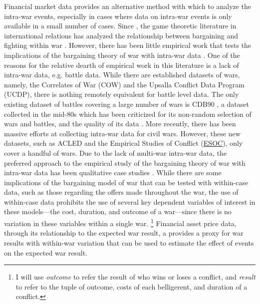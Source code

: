 \documentclass[11pt, oneside, article]{memoir}
\begin{document}
Financial market data provides an alternative method with which to analyze the intra-war events, especially in cases where data on intra-war events is only available in a small number of cases.
Since \textcite{Fearon1995}, the game theoretic literature in international relations has analyzed the relationship between bargaining and fighting within war \parencites{FilsonWerner2002}{Slantchev2003}{SmithStam2004}{Powell2004}{LeventogluSlantchev2007}{LangloisLanglois2009}{WolfordReiterCarrubba2011}.
However, there has been little empirical work that tests the implications of the bargaining theory of war with intra-war data \parencites{Goemans2000}{Ramsay2008}{Reiter2009}{Tierney2011}. 
One of the reasons for the relative dearth of empirical work in this literature is a lack of intra-war data, e.g. battle data. 
While there are established datasets of wars, namely, the Correlates of War (COW) \parencite{SarkeesWayman2010} and the Upsalla Conflict Data Program (UCDP), there is nothing remotely equivalent for battle level data.
The only existing dataset of battles covering a large number of wars is CDB90 \parencite{cdb90}, a dataset collected in the mid-80s which has been criticized for its non-random selection of wars and battles, and the quality of its data \parencite{BiddleLong2004}. %
More recently, there has been massive efforts at collecting intra-war data for civil wars. %
However, these new datasets, such as ACLED \parencites{RaleighLinkeHegreEtAl2010} and the Empirical Studies of Conflict (\href{http://esoc.princeton.edu/}{ESOC}), only cover a handful of wars.
Due to the lack of multi-war intra-war data, the preferred approach to the empirical study of the bargaining theory of war with intra-war data has been qualitative case studies \parencites{Reiter2003}[][Chapter 9]{Reiter2009}. 
While there are some implications of the bargaining model of war that can be tested with within-case data, such as those regarding the offers made throughout the war, the use of within-case data prohibits the use of several key dependent variables of interest in these models---the cost, duration, and outcome of a war---since there is no variation in these variables within a single war.%
\footnote{
  I will use \textit{outcome} to refer the result of who wins or loses a conflict, and \textit{result} to refer to the tuple of outcome, costs of each belligerent, and duration of a conflict.
}
Financial asset price data, through its relationship to the expected war result, a provides a proxy for war results with within-war variation that can be used to estimate the effect of events on the expected war result.
\end{document}
